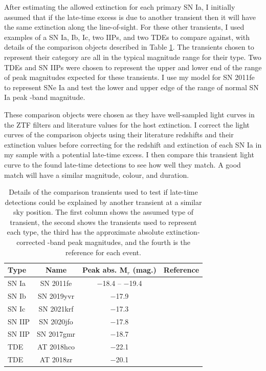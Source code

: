 \documentclass[a4paper,oneside,12pt, class=Latex/Classes/PhDthesisPSnPDF, crop=false]{standalone}
\begin{document}
After estimating the allowed extinction for each primary SN Ia, I initially assumed that if the late-time excess is due to another transient then it will have the same extinction along the line-of-sight. For these other transients, I used examples of a SN Ia, Ib, Ic, two IIPs, and two TDEs to compare against, with details of the comparison objects described in Table \ref{alt_trans}. The transients chosen to represent their category are all in the typical magnitude range for their type. Two TDEs and SN IIPs were chosen to represent the upper and lower end of the range of peak magnitudes expected for these transients. I use my model for SN 2011fe to represent SNe Ia and test the lower and upper edge of the range of normal SN Ia peak \ztfr-band magnitude.

These comparison objects were chosen as they have well-sampled light curves in the ZTF filters and literature values for the host extinction. I correct the light curves of the comparison objects using their literature redshifts and their extinction values before correcting for the redshift and extinction of each SN Ia in my sample with a potential late-time excess. I then compare this transient light curve to the found late-time detections to see how well they match. A good match will have a similar magnitude, colour, and duration.\\

\begin{table}
 \centering
 \caption{
 Details of the comparison transients used to test if late-time detections could be explained by another transient at a similar sky position. The first column shows the assumed type of transient, the second shows the transients used to represent each type, the third has the approximate absolute extinction-corrected \ztfr-band peak magnitudes, and the fourth is the reference for each event.}
 \begin{tabular}{lccc}
  \hline
   Type & Name & Peak abs. M$_{r}$ (mag.) & Reference\\
   \hline
   SN Ia & SN 2011fe & $-$18.4 -- $-$19.4 & \citet{spec_HST}\\
   SN Ib & SN 2019yvr & $-$17.9 & \citet{Ib_ex}\\
   SN Ic & SN 2021krf & $-$17.3 & \citet{21krf_ext}\\
   SN IIP & SN 2020jfo & $-$17.8 & \citet{IIp_ext}\\
   SN IIP & SN 2017gmr & $-$18.7 & \citet{2017gmr}\\
   TDE & AT 2018hco & $-$22.1 & \citet{TDE_ext}\\
   TDE & AT 2018zr & $-$20.1 & \citet{TDE_ext}\\
   \hline
 \end{tabular}
 \label{alt_trans}
\end{table}
\end{document}
